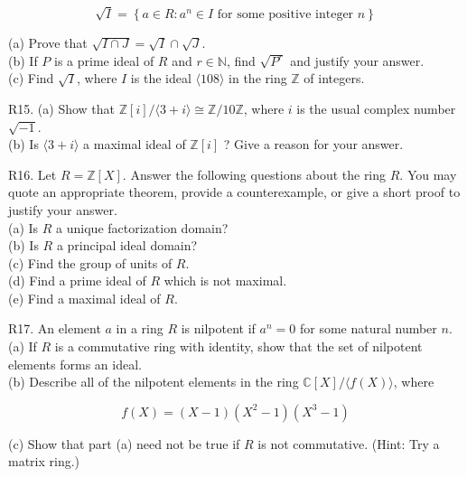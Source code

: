$$
\sqrt{I}=\left\{a \in R: a^{n} \in I \text { for some positive integer } n\right\}
$$

(a) Prove that $\sqrt{I \cap J}=\sqrt{I} \cap \sqrt{J}$.\\
(b) If $P$ is a prime ideal of $R$ and $r \in \mathbb{N}$, find $\sqrt{P^{r}}$ and justify your answer.\\
(c) Find $\sqrt{I}$, where $I$ is the ideal $\langle 108\rangle$ in the ring $\mathbb{Z}$ of integers.

R15. (a) Show that $\mathbb{Z}[i] /\langle 3+i\rangle \cong \mathbb{Z} / 10 \mathbb{Z}$, where $i$ is the usual complex number $\sqrt{-1}$.\\
(b) Is $\langle 3+i\rangle$ a maximal ideal of $\mathbb{Z}[i]$ ? Give a reason for your answer.

R16. Let $R=\mathbb{Z}[X]$. Answer the following questions about the ring $R$. You may quote an appropriate theorem, provide a counterexample, or give a short proof to justify your answer.\\
(a) Is $R$ a unique factorization domain?\\
(b) Is $R$ a principal ideal domain?\\
(c) Find the group of units of $R$.\\
(d) Find a prime ideal of $R$ which is not maximal.\\
(e) Find a maximal ideal of $R$.

R17. An element $a$ in a ring $R$ is nilpotent if $a^{n}=0$ for some natural number $n$.\\
(a) If $R$ is a commutative ring with identity, show that the set of nilpotent elements forms an ideal.\\
(b) Describe all of the nilpotent elements in the ring $\mathbb{C}[X] /\langle f(X)\rangle$, where

$$
f(X)=(X-1)\left(X^{2}-1\right)\left(X^{3}-1\right)
$$

(c) Show that part (a) need not be true if $R$ is not commutative. (Hint: Try a matrix ring.)

